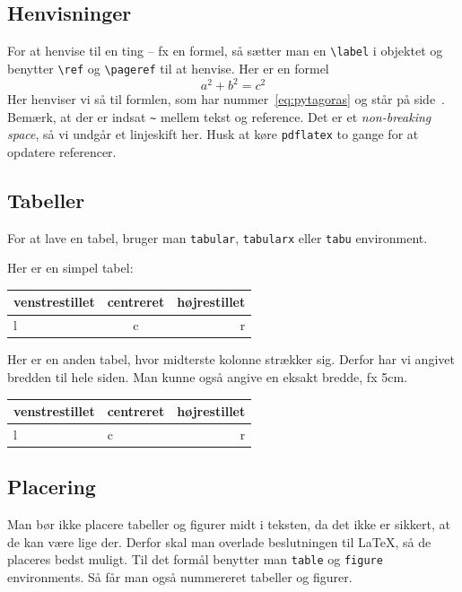 \documentclass[a4,12pt]{article}
\numberwithin{equation}{section}
\numberwithin{table}{section}
\numberwithin{figure}{section}
\begin{document}
\subsection{Henvisninger}
For at henvise til en ting -- fx en formel, så sætter man en \verb$\label$ i objektet og benytter \verb$\ref$ og \verb$\pageref$ til at henvise. Her er en formel
\begin{equation}
  a^2 + b^2 = c^2
  \label{eq:pytagoras}
\end{equation}
Her henviser vi så til formlen, som har nummer~\ref{eq:pytagoras} og står på side~\pageref{eq:pytagoras}. Bemærk, at der er indsat \verb$~$ mellem tekst og reference. Det er et \emph{non-breaking space}, så vi undgår et linjeskift her. Husk at køre \verb$pdflatex$ to gange for at opdatere referencer.

\subsection{Tabeller}
For at lave en tabel, bruger man \verb$tabular$, \verb$tabularx$ eller \verb$tabu$ environment.

Her er en simpel tabel:

\noindent
\begin{tabu}{|l|c|r|}
  \hline %
  \rowfont{\bfseries} %
  venstrestillet & centreret & højrestillet \\ %
  \hline %
  l & c & r \\
  \hline %
\end{tabu}

Her er en anden tabel, hvor midterste kolonne strækker sig. Derfor har vi angivet bredden til hele siden. Man kunne også angive en eksakt bredde, fx 5cm.

\noindent
\begin{tabu} to \textwidth {|l|X[c]|r|}
  \hline %
  \rowfont{\bfseries} %
  venstrestillet & centreret & højrestillet \\
  \hline %
  l & c & r \\
  \hline %
\end{tabu}

\subsection{Placering}
Man bør ikke placere tabeller og figurer midt i teksten, da det ikke er sikkert, at de kan være lige der. Derfor skal man overlade beslutningen til \LaTeX, så de placeres bedst muligt. Til det formål benytter man \verb$table$ og \verb$figure$ environments. Så får man også nummereret tabeller og figurer.
\end{document}
